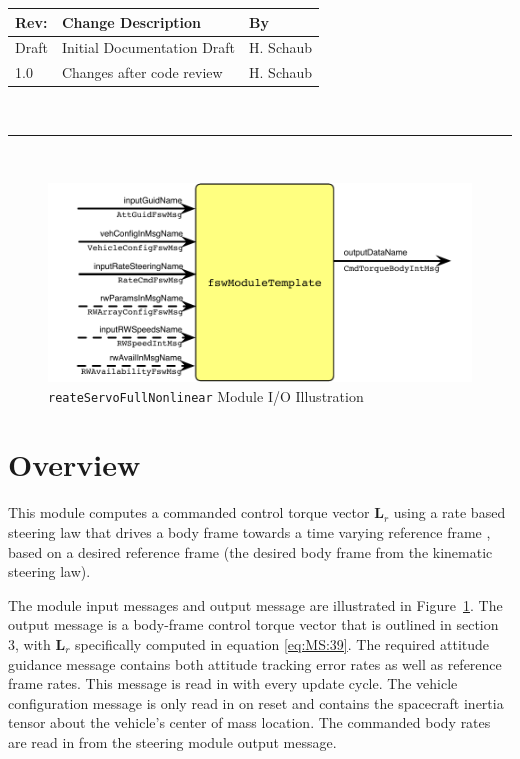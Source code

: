 \documentclass[]{BasiliskReportMemo}
\begin{document}
\makeCover


%
%
\pagestyle{empty}
{\renewcommand{\arraystretch}{2}
\noindent
\begin{longtable}{|p{0.5in}|p{4.5in}|p{1.14in}|}
\hline
{\bfseries Rev}: & {\bfseries Change Description} & {\bfseries By} \\
\hline
Draft & Initial Documentation Draft & H. Schaub \\
1.0 & Changes after code review & H. Schaub \\
\hline

\end{longtable}
}

\newpage
\setcounter{page}{1}
\pagestyle{fancy}

\tableofcontents
~\\ \hrule ~\\

\begin{figure}[htb]
	\centerline{
	\includegraphics[]{Figures/moduleImg}
	}
	\caption{{\tt reateServoFullNonlinear} Module I/O Illustration}
	\label{fig:moduleImg}
\end{figure}
\section{Overview}
This module computes a commanded control torque vector $\bm L_r$ using a rate based steering law that drives a body frame  towards a time varying reference frame , based on a desired reference frame  (the desired body frame from the kinematic steering law).

The module input messages  and output message are illustrated in Figure~\ref{fig:moduleImg}. The output message is a body-frame control torque vector that is outlined in section 3, with $\bm L_r$ specifically computed in equation \ref{eq:MS:39}.
 The required attitude guidance message contains both attitude tracking error rates as well as reference frame rates. This message is read in with every update cycle. The vehicle configuration message is only read in on reset and contains the spacecraft inertia tensor about the vehicle's center of mass location.  The commanded body rates are read in from the steering module output message.  
 
\end{document}
